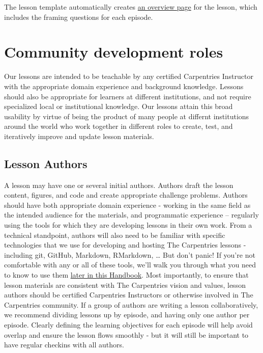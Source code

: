 \documentclass[
]{book}
\begin{document}
The lesson template automatically creates \href{https://datacarpentry.org/shell-genomics/}{an overview page} for the lesson, which includes the framing
questions for each episode.

\hypertarget{community-development-roles}{%
\chapter{Community development roles}\label{community-development-roles}}

Our lessons are intended to be teachable by any certified
Carpentries Instructor with the appropriate domain experience
and background knowledge. Lessons should also be appropriate for
learners at different institutions, and not require specialized
local or institutional knowledge. Our lessons attain this
broad usability by virtue of being the product of many people
at differnt institutions around the world who work together
in different roles to create, test, and iteratively improve and
update lesson materials.

\hypertarget{lesson-authors}{%
\section{Lesson Authors}\label{lesson-authors}}

A lesson may have one or several initial authors. Authors draft
the lesson content, figures, and code and create appropriate challenge problems. Authors should have both appropriate domain
experience - working in the same field as the intended audience for the materials,
and programmatic experience -- regularly using the tools for which they are
developing lessons in their own work. From a technical standpoint, authors
will also need to be familiar with specific technologies that we use for
developing and hosting The Carpentries lessons - including git, GitHub, Markdown,
RMarkdown, \ldots{} But don't panic! If you're not comfortable with any or all of these
tools, we'll walk you through what you need to know to use them \protect\hyperlink{technological-introductions}{later in this
Handbook}. Most importantly, to ensure that lesson materials are consistent with The Carpentries vision and
values,
lesson authors should be certified Carpentries Instructors or otherwise involved
in The Carpentries community. If a group of authors are writing a lesson
collaboratively, we recommend dividing lessons up by episode, and having only one
author per episode. Clearly defining the learning objectives for each episode
will help avoid overlap and ensure the lesson flows smoothly - but it will
still be important to have regular checkins with all authors.
\end{document}
